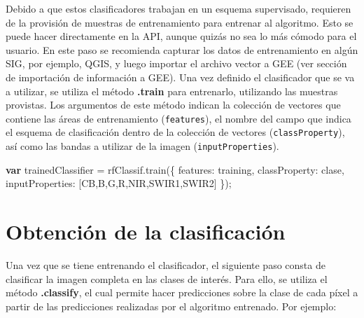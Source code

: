 \documentclass[
  12pt,
  letterpaper,
  twoside]{book}
\newenvironment{Shaded}{\begin{snugshade}}{\end{snugshade}}
\newcommand{\ControlFlowTok}[1]{\textcolor[rgb]{0.00,0.00,0.00}{\textbf{#1}}}
\newcommand{\DataTypeTok}[1]{\textcolor[rgb]{0.00,0.00,0.00}{#1}}
\newcommand{\FunctionTok}[1]{\textcolor[rgb]{0.48,0.12,0.64}{#1}}
\newcommand{\NormalTok}[1]{#1}
\newcommand{\OperatorTok}[1]{\textcolor[rgb]{0.00,0.00,0.00}{#1}}
\newcommand{\StringTok}[1]{\textcolor[rgb]{0.87,0.29,0.22}{#1}}
\newcommand\boldpurple[1]{\textcolor{darkpurple}{\textbf{#1}}}
\begin{document}
Debido a que estos clasificadores trabajan en un esquema supervisado, requieren de la provisión de muestras de entrenamiento para entrenar al algoritmo. Esto se puede hacer directamente en la API, aunque quizás no sea lo más cómodo para el usuario. En este paso se recomienda capturar los datos de entrenamiento en algún SIG, por ejemplo, QGIS, y luego importar el archivo vector a GEE (ver sección de importación de información a GEE). Una vez definido el clasificador que se va a utilizar, se utiliza el método \boldpurple{.train} para entrenarlo, utilizando las muestras provistas. Los argumentos de este método indican la colección de vectores que contiene las áreas de entrenamiento (\texttt{features}), el nombre del campo que indica el esquema de clasificación dentro de la colección de vectores (\texttt{classProperty}), así como las bandas a utilizar de la imagen (\texttt{inputProperties}).

\begin{Shaded}
\begin{Highlighting}[]
\ControlFlowTok{var}\NormalTok{ trainedClassifier }\OperatorTok{=}\NormalTok{ rfClassif}\OperatorTok{.}\FunctionTok{train}\NormalTok{(\{}
  \DataTypeTok{features}\OperatorTok{:}\NormalTok{ training}\OperatorTok{,}
  \DataTypeTok{classProperty}\OperatorTok{:} \StringTok{\textquotesingle{}clase\textquotesingle{}}\OperatorTok{,}
  \DataTypeTok{inputProperties}\OperatorTok{:}\NormalTok{ [}\StringTok{\textquotesingle{}CB\textquotesingle{}}\OperatorTok{,}\StringTok{\textquotesingle{}B\textquotesingle{}}\OperatorTok{,}\StringTok{\textquotesingle{}G\textquotesingle{}}\OperatorTok{,}\StringTok{\textquotesingle{}R\textquotesingle{}}\OperatorTok{,}\StringTok{\textquotesingle{}NIR\textquotesingle{}}\OperatorTok{,}\StringTok{\textquotesingle{}SWIR1\textquotesingle{}}\OperatorTok{,}\StringTok{\textquotesingle{}SWIR2\textquotesingle{}}\NormalTok{]}
\NormalTok{\})}\OperatorTok{;}
\end{Highlighting}
\end{Shaded}

\hypertarget{obtenciuxf3n-de-la-clasificaciuxf3n}{%
\section{Obtención de la clasificación}\label{obtenciuxf3n-de-la-clasificaciuxf3n}}

Una vez que se tiene entrenando el clasificador, el siguiente paso consta de clasificar la imagen completa en las clases de interés. Para ello, se utiliza el método \boldpurple{.classify}, el cual permite hacer predicciones sobre la clase de cada píxel a partir de las predicciones realizadas por el algoritmo entrenado. Por ejemplo:
\end{document}
